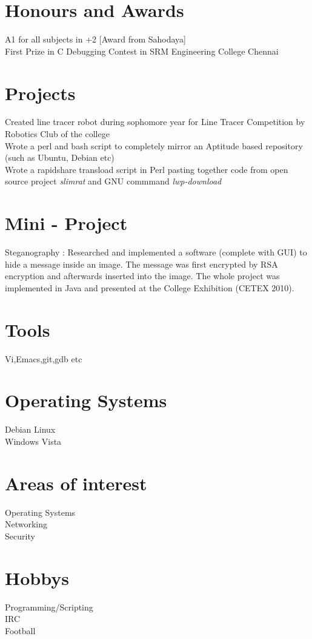 \documentclass[line,margin]{res}
\begin{document}
\begin{resume}
\section{Honours and Awards}
A1 for all subjects in +2  [Award from Sahodaya]\\
First Prize in C Debugging Contest in SRM Engineering College Chennai

\section{Projects}
Created line tracer robot during sophomore year for Line Tracer Competition by Robotics Club of the college\\

Wrote a perl and bash script to completely mirror an Aptitude based repository (such as Ubuntu, Debian etc)\\

Wrote a rapidshare transload script in Perl pasting together code from open source project {\it slimrat} and GNU commmand {\it lwp-download}
\section{Mini - Project}
Steganography : Researched and implemented a software (complete with GUI) to hide a message inside an image. The message was first encrypted by RSA encryption and afterwards inserted into the image. The whole project was implemented in Java and presented at the College Exhibition (CETEX 2010).

\section{Tools}
Vi,Emacs,git,gdb etc

\section{Operating Systems}
Debian Linux\\
Windows Vista\\

\section{Areas of interest}
Operating Systems\\
Networking\\
Security\\

\section{Hobbys}
Programming/Scripting\\
IRC\\
Football\\

\end{resume}
\end{document}
